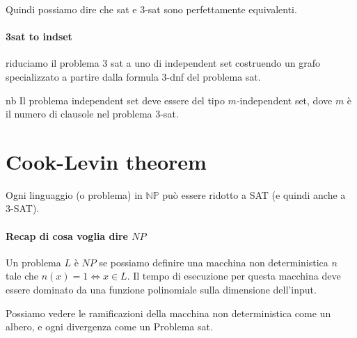 \documentclass{article}
\begin{document}
Quindi possiamo dire che sat e 3-sat sono perfettamente equivalenti.

\paragraph{3sat to indset} riduciamo il problema 3 sat a uno di independent set costruendo un grafo specializzato a partire dalla formula 3-dnf del problema sat.
\begin{callout}{nb}
    Il problema independent set deve essere del tipo $m$-independent set, dove $m$ è il numero di clausole nel problema 3-sat.
\end{callout}

\section{Cook-Levin theorem}
Ogni linguaggio (o problema) in $\mathbb{NP}$ può essere ridotto a SAT (e quindi anche a 3-SAT).

\paragraph{Recap di cosa voglia dire $NP$} Un problema $L$ è $NP$ se possiamo definire una macchina non deterministica $n$ tale che $n(x)=1\iff x\in L$. Il tempo di esecuzione per questa macchina deve essere dominato da una funzione polinomiale sulla dimensione dell'input.

Possiamo vedere le ramificazioni della macchina non deterministica come un albero, e ogni divergenza come un Problema sat.
\end{document}
